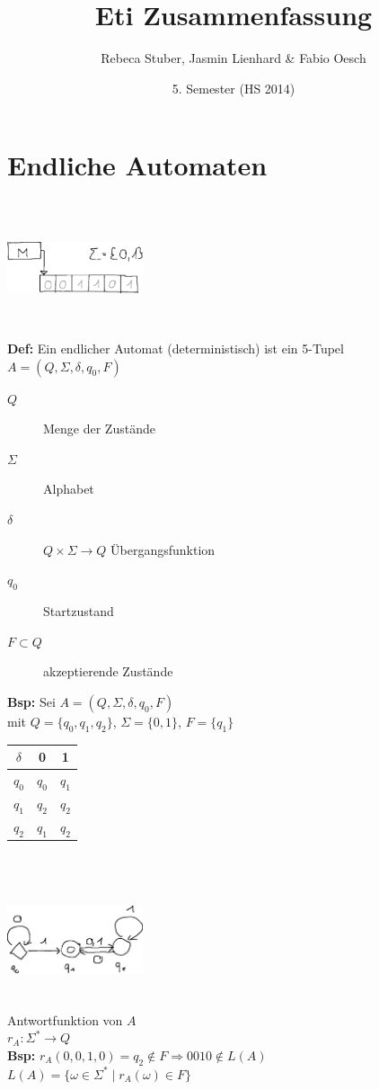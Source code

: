 \documentclass[a4paper,10pt,landscape,twocolumn]{article}
\title{
	Eti Zusammenfassung
}
\author{Rebeca Stuber, Jasmin Lienhard \& Fabio Oesch}
\date{5. Semester (HS 2014)}
\newcommand{\Bold}[1]{\textbf{#1}} %
\begin{document}
\maketitle
\thispagestyle{fancy}

\pagebreak

\tableofcontents	  	


\pagebreak
\setcounter{page}{1}

\section{Endliche Automaten}
\includegraphics[width=0.3\textwidth,height=4cm,keepaspectratio]{Bild1.eps}\\
\Bold{Def:} Ein endlicher Automat (deterministisch) ist ein 5-Tupel $A=(Q,\Sigma,\delta,q_0,F)$
\begin{description}
 \item [$Q$] Menge der Zust\"ande
 \item [$\Sigma$] Alphabet
 \item [$\delta$] $Q\times\Sigma\to Q$ \"Ubergangsfunktion
 \item [$q_0$] Startzustand
 \item [$F\subset Q$] akzeptierende Zust\"ande
\end{description}
\Bold{Bsp:} Sei $A=(Q,\Sigma,\delta,q_0,F)$\\
mit $Q=\{q_0,q_1,q_2\}$, $\Sigma=\{0,1\}$, $F=\{q_1\}$\\
\begin{tabular}{c|c|c}
 $\delta$&0&1\\\hline
 $q_0$&$q_0$&$q_1$\\
 $q_1$&$q_2$&$q_2$\\
 $q_2$&$q_1$&$q_2$\\
\end{tabular}\\
\includegraphics[width=0.3\textwidth,height=4cm,keepaspectratio]{Bild3.eps}\\
Antwortfunktion von $A$\\
$r_A:\Sigma^*\to Q$\\
\Bold{Bsp:} $r_A(0,0,1,0)=q_2 \notin F\Rightarrow0010\notin L(A)$\\
$L(A)=\{\omega\in\Sigma^*\mid r_A(\omega)\in F\}$
\end{document}
